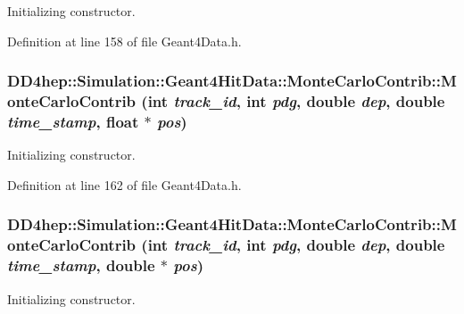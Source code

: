Initializing constructor. 

Definition at line 158 of file Geant4Data.h.\hypertarget{class_d_d4hep_1_1_simulation_1_1_geant4_hit_data_1_1_monte_carlo_contrib_a52279e49adb2ef0be6fde7fdbf43d57f}{
\subsubsection[{MonteCarloContrib}]{\setlength{\rightskip}{0pt plus 5cm}DD4hep::Simulation::Geant4HitData::MonteCarloContrib::MonteCarloContrib (int {\em track\_\-id}, \/  int {\em pdg}, \/  double {\em dep}, \/  double {\em time\_\-stamp}, \/  float $\ast$ {\em pos})}}
\label{class_d_d4hep_1_1_simulation_1_1_geant4_hit_data_1_1_monte_carlo_contrib_a52279e49adb2ef0be6fde7fdbf43d57f}


Initializing constructor. 

Definition at line 162 of file Geant4Data.h.\hypertarget{class_d_d4hep_1_1_simulation_1_1_geant4_hit_data_1_1_monte_carlo_contrib_ac8d6f1ef4bbb713c2f7a1ee10230450e}{
\subsubsection[{MonteCarloContrib}]{\setlength{\rightskip}{0pt plus 5cm}DD4hep::Simulation::Geant4HitData::MonteCarloContrib::MonteCarloContrib (int {\em track\_\-id}, \/  int {\em pdg}, \/  double {\em dep}, \/  double {\em time\_\-stamp}, \/  double $\ast$ {\em pos})}}
\label{class_d_d4hep_1_1_simulation_1_1_geant4_hit_data_1_1_monte_carlo_contrib_ac8d6f1ef4bbb713c2f7a1ee10230450e}


Initializing constructor. 

